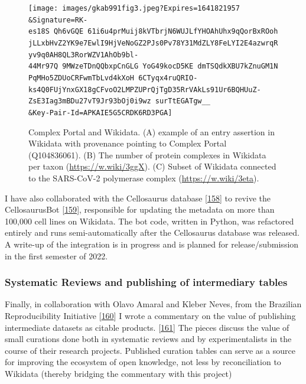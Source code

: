 \begin{figure}
\hypertarget{fig:complexportal}{%
\centering
\texttt{[image: images/gkab991fig3.jpeg?Expires=1641821957\\\&Signature=RK-es18S~Qh6vGQE~61i6u4prMuij8kVTbrjN6WUJLfYHOAhUhx9qQorBxROohjLLxbHvZ2YK9e7EwlI9HjVeNoGZ2PJs0Pv78Y31MdZLY8FeLYI2E4azwrqRyv9q0AH8QL3RorWZV1AhOb9bl-44Mr97Q~9MWzeTDnQQbxpCnGLG~YoG49kocD5KE~dmTSQdkXBU7kZnuGM1NPqMHo5ZDUoCRFwmTbLvd4kXoH~6CTyqx4ruQRIO-ks4Q0FUjYnxGX18gCFvoO2LMPZUPrQjTgD35RrVAkLs91Ur6BQHUuZ-ZsE3Iag3mBDu27vT9Jr93bOj0i9wz~surTtEGATgw\_\_\\\&Key-Pair-Id=APKAIE5G5CRDK6RD3PGA]}
\caption{Complex Portal and Wikidata. (A) example of an entry assertion in Wikidata with provenance pointing to Complex Portal (Q104836061). (B) The number of protein complexes in Wikidata per taxon (\url{https://w.wiki/3ggX}). (C) Subset of Wikidata connected to the SARS-CoV-2 polymerase complex (\url{https://w.wiki/3eta}).}\label{fig:complexportal}
}
\end{figure}

I have also collaborated with the Cellosaurus database {[}\protect\hyperlink{ref-1DguATd9G}{158}{]} to revive the CellosaurusBot {[}\protect\hyperlink{ref-lMQxhx3q}{159}{]}, responsible for updating the metadata on more than 100,000 cell lines on Wikidata. The bot code, written in Python, was refactored entirely and runs semi-automatically after the Cellosaurus database was released. A write-up of the integration is in progress and is planned for release/submission in the first semester of 2022.

\hypertarget{systematic-reviews-and-publishing-of-intermediary-tables}{%
\subsubsection{Systematic Reviews and publishing of intermediary tables}\label{systematic-reviews-and-publishing-of-intermediary-tables}}

Finally, in collaboration with Olavo Amaral and Kleber Neves, from the Brazilian Reproducibility Initiative {[}\protect\hyperlink{ref-F2mYjDJ0}{160}{]} I wrote a commentary on the value of publishing intermediate datasets as citable products. {[}\protect\hyperlink{ref-oXMFSv5v}{161}{]}
The pieces discuss the value of small curations done both in systematic reviews and by experimentalists in the course of their research projects. Published curation tables can serve as a source for improving the ecosystem of open knowledge, not less by reconciliation to Wikidata (thereby bridging the commentary with this project)

